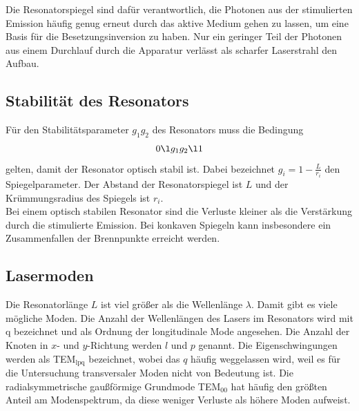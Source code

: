 Die Resonatorspiegel sind dafür verantwortlich, die Photonen aus der stimulierten Emission häufig genug erneut durch das aktive Medium gehen zu lassen, um eine Basis für die Besetzungsinversion zu haben. Nur ein geringer Teil der Photonen aus einem Durchlauf durch die Apparatur verlässt als scharfer Laserstrahl den Aufbau.

\subsection{Stabilität des Resonators}
\label{subsec:stabilitaetTheorie}
Für den Stabilitätsparameter $g_1 g_2$ des Resonators muss die Bedingung
\begin{equation}
  0 \l g_1 g_2 \l 1
  \label{eqn:stabilitaet}
\end{equation}
gelten, damit der Resonator optisch stabil ist. Dabei bezeichnet $g_i = 1 - \frac{L}{r_i}$ den Spiegelparameter. Der Abstand der Resonatorspiegel ist $L$ und der Krümmungsradius des Spiegels ist $r_i$.\\
Bei einem optisch stabilen Resonator sind die Verluste kleiner als die Verstärkung durch die stimulierte Emission. Bei konkaven Spiegeln kann insbesondere ein Zusammenfallen der Brennpunkte erreicht werden.

\subsection{Lasermoden}
\label{subsec:modenTheorie}
Die Resonatorlänge $L$ ist viel größer als die Wellenlänge $\lambda$. Damit gibt es viele mögliche Moden. Die Anzahl der Wellenlängen des Lasers im Resonators wird mit q bezeichnet und als Ordnung der longitudinale Mode angesehen. Die Anzahl der Knoten in $x$- und $y$-Richtung werden $l$ und $p$ genannt. Die Eigenschwingungen werden als TEM$_\mathrm{lpq}$ bezeichnet, wobei das $q$ häufig weggelassen wird, weil es für die Untersuchung transversaler Moden nicht von Bedeutung ist. Die radialsymmetrische gaußförmige Grundmode TEM$_{\mathrm{00}}$ hat häufig den größten Anteil am Modenspektrum, da diese weniger Verluste als höhere Moden aufweist. 
